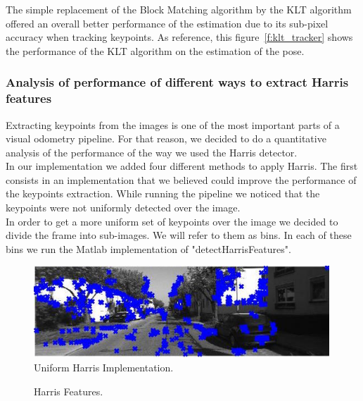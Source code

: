 The simple replacement of the Block Matching algorithm by the KLT algorithm offered an overall better performance of the estimation due to its sub-pixel accuracy when tracking keypoints. As reference, this figure~\ref{f:klt_tracker} shows the performance of the KLT algorithm on the estimation of the pose.

\subsubsection{Analysis of performance of different ways to extract Harris features}

Extracting keypoints from the images is one of the most important parts of a visual odometry pipeline. For that reason, we
decided to do a quantitative analysis of the performance of the way we used the Harris detector. \\
In our implementation we added four different methods to apply Harris.
The first consists in an implementation that we believed could improve the performance of the keypoints extraction.
While running the pipeline we noticed that the keypoints were not uniformly detected over the image. \\
In order to get a more uniform set of keypoints over the image we decided to divide the frame into sub-images. We will refer to them
as bins. In each of these bins we run the Matlab implementation of "detectHarrisFeatures".

\begin{figure}
  \includegraphics[width=0.99\textwidth]{files/custom_uniform_keypoints.jpg}
  \caption[\label{f:custom_uniform}Uniform Harris Implementation]{Uniform Harris Implementation.}
\end{figure}

\begin{figure}[b]
\caption[Harris Features]{\label{f:harris}Harris Features.}
\end{figure}

